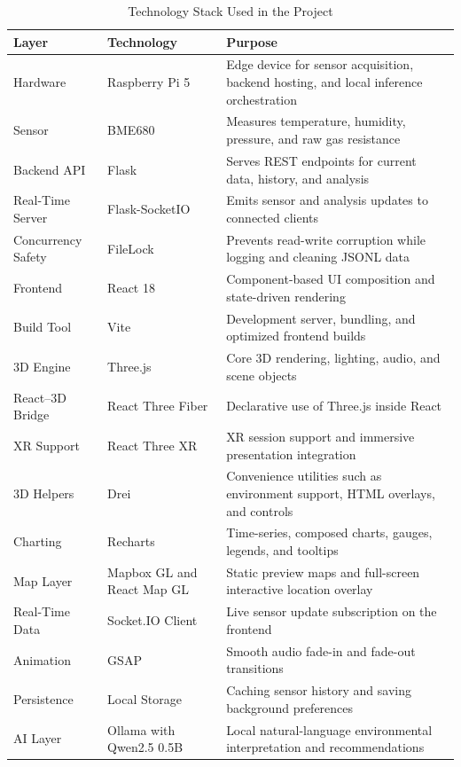 \documentclass[conference]{IEEEtran}
\begin{document}
\begin{table}[!t]
\caption{Technology Stack Used in the Project}
\label{tab:stack}
\centering
\begin{tabular}{>{\raggedright\arraybackslash}p{1.45cm} >{\raggedright\arraybackslash}p{2.2cm} >{\raggedright\arraybackslash}p{3.55cm}}
\toprule
\textbf{Layer} & \textbf{Technology} & \textbf{Purpose} \\
\midrule
Hardware & Raspberry Pi 5 & Edge device for sensor acquisition, backend hosting, and local inference orchestration \\
Sensor & BME680 & Measures temperature, humidity, pressure, and raw gas resistance \\
Backend API & Flask & Serves REST endpoints for current data, history, and analysis \\
Real-Time Server & Flask-SocketIO & Emits sensor and analysis updates to connected clients \\
Concurrency Safety & FileLock & Prevents read-write corruption while logging and cleaning JSONL data \\
Frontend & React 18 & Component-based UI composition and state-driven rendering \\
Build Tool & Vite & Development server, bundling, and optimized frontend builds \\
3D Engine & Three.js & Core 3D rendering, lighting, audio, and scene objects \\
React--3D Bridge & React Three Fiber & Declarative use of Three.js inside React \\
XR Support & React Three XR & XR session support and immersive presentation integration \\
3D Helpers & Drei & Convenience utilities such as environment support, HTML overlays, and controls \\
Charting & Recharts & Time-series, composed charts, gauges, legends, and tooltips \\
Map Layer & Mapbox GL and React Map GL & Static preview maps and full-screen interactive location overlay \\
Real-Time Data & Socket.IO Client & Live sensor update subscription on the frontend \\
Animation & GSAP & Smooth audio fade-in and fade-out transitions \\
Persistence & Local Storage & Caching sensor history and saving background preferences \\
AI Layer & Ollama with Qwen2.5 0.5B & Local natural-language environmental interpretation and recommendations \\
\bottomrule
\end{tabular}
\end{table}
\end{document}
